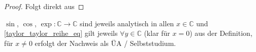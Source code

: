 \begin{proof}
	Folgt direkt aus 
\end{proof}

\begin{example}
	$\sin$, $\cos$, $\exp:\mathbb{C}\to\mathbb{C}$ sind jeweils analytisch in allen $x\in\mathbb{C}$ und \eqref{taylor_taylor_reihe_eq} gilt jeweils $\forall y\in\mathbb{C}$ (klar für $x=0$) aus der Definition, für $x\neq 0$ erfolgt der Nachweis als ÜA / Selbststudium.
\end{example}
